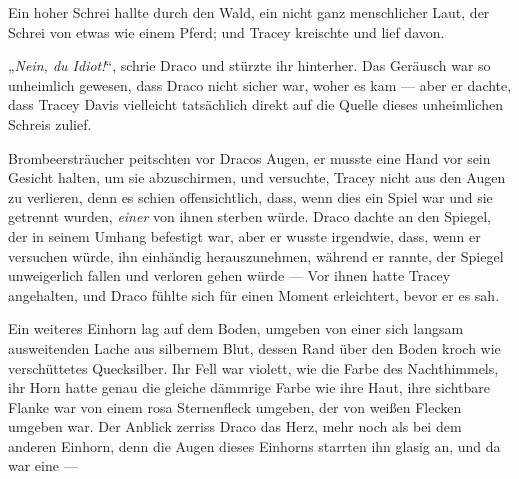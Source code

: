 Ein hoher Schrei hallte durch den Wald, ein nicht ganz menschlicher Laut, der Schrei von etwas wie einem Pferd; und Tracey kreischte und lief davon.

„\emph{Nein, du Idiot!}“, schrie Draco und stürzte ihr hinterher. Das Geräusch war so unheimlich gewesen, dass Draco nicht sicher war, woher es kam — aber er dachte, dass Tracey Davis vielleicht tatsächlich direkt auf die Quelle dieses unheimlichen Schreis zulief.

Brombeersträucher peitschten vor Dracos Augen, er musste eine Hand vor sein Gesicht halten, um sie abzuschirmen, und versuchte, Tracey nicht aus den Augen zu verlieren, denn es schien offensichtlich, dass, wenn dies ein Spiel war und sie getrennt wurden, \emph{einer} von ihnen sterben würde. Draco dachte an den Spiegel, der in seinem Umhang befestigt war, aber er wusste irgendwie, dass, wenn er versuchen würde, ihn einhändig herauszunehmen, während er rannte, der Spiegel unweigerlich fallen und verloren gehen würde —
Vor ihnen hatte Tracey angehalten, und Draco fühlte sich für einen Moment erleichtert, bevor er es sah.

Ein weiteres Einhorn lag auf dem Boden, umgeben von einer sich langsam ausweitenden Lache aus silbernem Blut, dessen Rand über den Boden kroch wie verschüttetes Quecksilber. Ihr Fell war violett, wie die Farbe des Nachthimmels, ihr Horn hatte genau die gleiche dämmrige Farbe wie ihre Haut, ihre sichtbare Flanke war von einem rosa Sternenfleck umgeben, der von weißen Flecken umgeben war. Der Anblick zerriss Draco das Herz, mehr noch als bei dem anderen Einhorn, denn die Augen dieses Einhorns starrten ihn glasig an, und da war eine —


